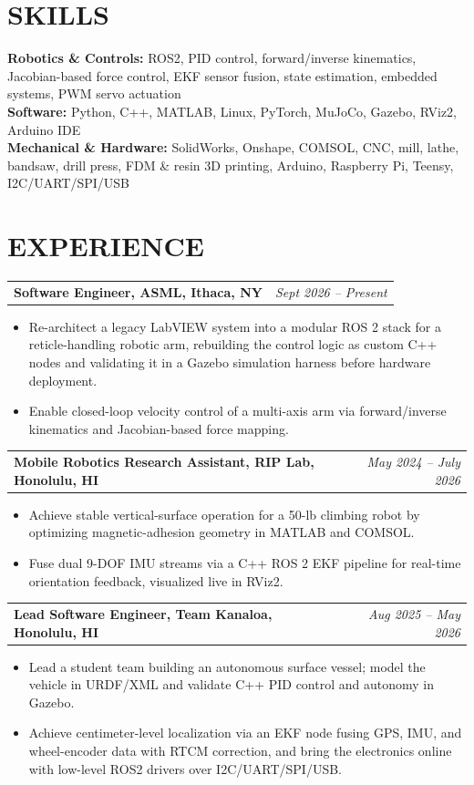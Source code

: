 \documentclass[10.5pt]{article}
\makeatletter
\newcommand{\entryline}[2]{%
  \noindent
  \begin{tabularx}{\linewidth}{@{}X r@{}}
    \textbf{#1} & \textit{#2}
  \end{tabularx}%
  \par
}
\newcommand{\subgap}{\vspace{3pt}}   %
\newcommand{\entrygap}{\vspace{5pt}} %
\makeatother
\begin{document}
\section{SKILLS}
\noindent\textbf{Robotics \& Controls:} ROS2, PID control, forward/inverse kinematics, Jacobian-based force control, EKF sensor fusion, state estimation, embedded systems, PWM servo actuation\\
\textbf{Software:} Python, C++, MATLAB, Linux, PyTorch, MuJoCo, Gazebo, RViz2, Arduino IDE\\
\textbf{Mechanical \& Hardware:} SolidWorks, Onshape, COMSOL, CNC, mill, lathe, bandsaw, drill press, FDM \& resin 3D printing, Arduino, Raspberry Pi, Teensy, I2C/UART/SPI/USB
\par

\section{EXPERIENCE}

\entryline{Software Engineer, ASML, Ithaca, NY}{Sept 2026 -- Present}
\subgap
\begin{itemize}
  \item Re-architect a legacy LabVIEW system into a modular ROS 2 stack for a reticle-handling robotic arm, rebuilding the control logic as custom C++ nodes and validating it in a Gazebo simulation harness before hardware deployment.
  \item Enable closed-loop velocity control of a multi-axis arm via forward/inverse kinematics and Jacobian-based force mapping.
\end{itemize}
\entrygap

\entryline{Mobile Robotics Research Assistant, RIP Lab, Honolulu, HI}{May 2024 -- July 2026}
\subgap
\begin{itemize}
  \item Achieve stable vertical-surface operation for a 50-lb climbing robot by optimizing magnetic-adhesion geometry in MATLAB and COMSOL.
  \item Fuse dual 9-DOF IMU streams via a C++ ROS 2 EKF pipeline for real-time orientation feedback, visualized live in RViz2.
\end{itemize}
\entrygap

\entryline{Lead Software Engineer, Team Kanaloa, Honolulu, HI}{Aug 2025 -- May 2026}
\subgap
\begin{itemize}
  \item Lead a student team building an autonomous surface vessel; model the vehicle in URDF/XML and validate C++ PID control and autonomy in Gazebo.
  \item Achieve centimeter-level localization via an EKF node fusing GPS, IMU, and wheel-encoder data with RTCM correction, and bring the electronics online with low-level ROS2 drivers over I2C/UART/SPI/USB.
\end{itemize}
\entrygap
\end{document}
